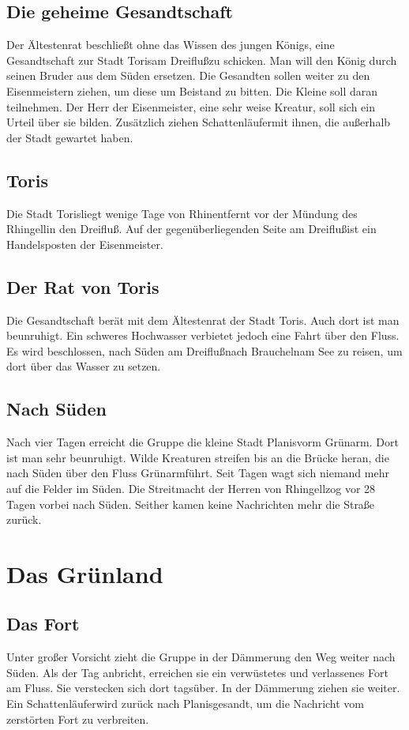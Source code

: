 \documentclass[12pt,a4paper,onecolumn,twoside,ngerman]{book}
\newcommand{\Schattenjager}{Schattenläufer}
\newcommand{\Rhingell}{Rhingell}
\newcommand{\Rhin}{Rhin}
\newcommand{\Dreifluss}{Dreifluß}
\newcommand{\Toris}{Toris}
\newcommand{\Planis}{Planis}
\newcommand{\Grunarm}{Grünarm}
\newcommand{\Grunland}{Grünland}
\newcommand{\Braucheln}{Braucheln}
\newcommand{\Eisenmeister}{Eisenmeister}
\begin{document}
\section{Die geheime Gesandtschaft}
Der Ältestenrat beschließt ohne das Wissen des jungen Königs, eine Gesandtschaft zur Stadt \Toris am \Dreifluss zu schicken. Man will den König durch seinen Bruder aus dem Süden ersetzen. Die Gesandten sollen weiter zu den \Eisenmeister{n} ziehen, um diese um Beistand zu bitten. Die Kleine soll daran teilnehmen. Der Herr der \Eisenmeister, eine sehr weise Kreatur, soll sich ein Urteil über sie bilden. Zusätzlich ziehen \Schattenjager mit ihnen, die außerhalb der Stadt gewartet haben.

\section{\Toris}
Die Stadt \Toris liegt wenige Tage von \Rhin entfernt vor der Mündung des \Rhingell in den \Dreifluss. Auf der gegenüberliegenden Seite am \Dreifluss ist ein Handelsposten der \Eisenmeister.

\section{Der Rat von \Toris}
Die Gesandtschaft berät mit dem Ältestenrat der Stadt \Toris. Auch dort ist man beunruhigt. Ein schweres Hochwasser verbietet jedoch eine Fahrt über den Fluss. Es wird beschlossen, nach Süden am \Dreifluss nach \Braucheln am See zu reisen, um dort über das Wasser zu setzen.

\section{Nach Süden}
Nach vier Tagen erreicht die Gruppe die kleine Stadt \Planis vorm \Grunarm. Dort ist man sehr beunruhigt. Wilde Kreaturen streifen bis an die Brücke heran, die nach Süden über den Fluss \Grunarm führt. Seit Tagen wagt sich niemand mehr auf die Felder im Süden. Die Streitmacht der Herren von \Rhingell zog vor 28 Tagen vorbei nach Süden. Seither kamen keine Nachrichten mehr die Straße zurück.
 
\chapter{Das \Grunland}
\section{Das Fort}
Unter großer Vorsicht zieht die Gruppe in der Dämmerung den Weg weiter nach Süden. Als der Tag anbricht, erreichen sie ein verwüstetes und verlassenes Fort am Fluss. Sie verstecken sich dort tagsüber. In der Dämmerung ziehen sie weiter. Ein \Schattenjager wird zurück nach \Planis gesandt, um die Nachricht vom zerstörten Fort zu verbreiten.
\end{document}
